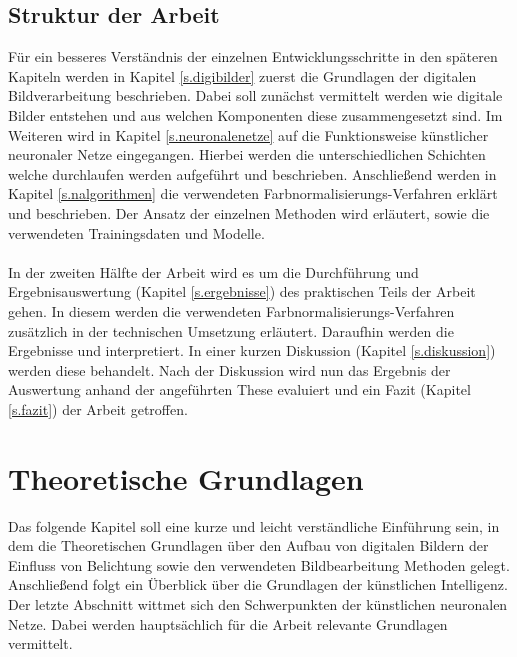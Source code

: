 \documentclass[a4paper,12pt,oneside]{article}
\begin{document}
  \subsection{Struktur der Arbeit}\label{Struktur} 
Für ein besseres Verständnis der einzelnen Entwicklungsschritte in den späteren Kapiteln werden in Kapitel \ref{s.digibilder} zuerst die Grundlagen der digitalen Bildverarbeitung beschrieben. Dabei soll zunächst vermittelt werden wie digitale Bilder entstehen und aus welchen Komponenten diese zusammengesetzt sind. Im Weiteren wird in Kapitel \ref{s.neuronalenetze} auf die Funktionsweise künstlicher neuronaler Netze eingegangen. Hierbei werden die unterschiedlichen Schichten welche durchlaufen werden aufgeführt und beschrieben. Anschließend werden in Kapitel \ref{s.nalgorithmen} die verwendeten Farbnormalisierungs-Verfahren erklärt und beschrieben. Der Ansatz der einzelnen Methoden wird erläutert, sowie die verwendeten Trainingsdaten und Modelle.\\\\
In der zweiten Hälfte der Arbeit wird es um die Durchführung und Ergebnisauswertung (Kapitel \ref{s.ergebnisse}) des praktischen Teils der Arbeit gehen. In diesem werden die verwendeten Farbnormalisierungs-Verfahren zusätzlich in der technischen Umsetzung erläutert. Daraufhin werden die Ergebnisse und interpretiert. In einer kurzen Diskussion (Kapitel \ref{s.diskussion}) werden diese behandelt. Nach der Diskussion wird nun das Ergebnis der Auswertung anhand der angeführten These evaluiert und ein Fazit (Kapitel \ref{s.fazit}) der Arbeit getroffen.
  \newpage
  \section{Theoretische Grundlagen}\label{s.grundlagen}
  Das folgende Kapitel soll eine kurze und leicht verständliche Einführung sein, in dem die Theoretischen Grundlagen über den Aufbau von digitalen Bildern der Einfluss von Belichtung sowie den verwendeten Bildbearbeitung Methoden gelegt. Anschließend folgt ein Überblick über die Grundlagen der künstlichen Intelligenz. Der letzte Abschnitt wittmet sich den Schwerpunkten der künstlichen neuronalen Netze. Dabei werden hauptsächlich für die Arbeit relevante Grundlagen vermittelt. 
\end{document}
